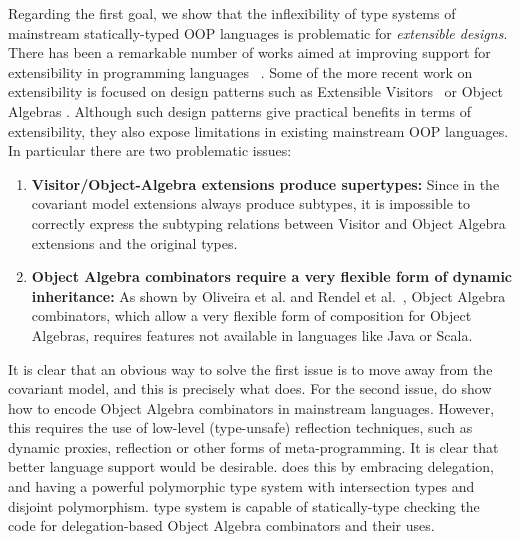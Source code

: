 Regarding the first goal, we show that the inflexibility of type systems of
mainstream statically-typed OOP languages is problematic for
\emph{extensible designs}.
There has been a remarkable number of works aimed at improving support
for extensibility in programming languages
~\cite{Prehofer97,Tarr99ndegrees,Harrison93subject,McDirmid01Jiazzi,Aracic06CaesarJ,Smaragdakis98mixin,nystrom2006j,togersen:2004,Zenger-Odersky2005,oliveira09modular,oliveira2012extensibility}. 
Some of the more recent work on extensibility is focused on design
patterns such as Extensible
Visitors~\cite{togersen:2004,oliveira09modular} or Object Algebras
\cite{oliveira2012extensibility}. 
Although such design patterns give practical benefits in terms of
extensibility, they also expose limitations in existing mainstream OOP
languages. In particular there are two problematic issues:

\begin{enumerate}

\item {\bf Visitor/Object-Algebra extensions produce supertypes:}
  Since in the covariant model extensions always produce subtypes, it
  is impossible to correctly express the subtyping relations between
  Visitor and Object Algebra extensions and the original types.

\item {\bf Object Algebra combinators require a very flexible form of
    dynamic inheritance:} As shown by Oliveira et al. and Rendel et
  al.~\cite{oliveira2013feature,rendel14attributes}, Object Algebra
  combinators, which allow a very flexible form of composition for
  Object Algebras, requires features not available in languages like
  Java or Scala.

\end{enumerate}

It is clear that an obvious way to solve the first issue is to 
move away from the covariant model, and this is precisely what \name does. 
For the second issue, \citet{oliveira2013feature,rendel14attributes}
do show how to encode Object Algebra combinators in mainstream
languages. However, this requires the
use of low-level (type-unsafe) reflection techniques, such as dynamic proxies,
reflection or other forms of meta-programming. It is clear
that better language support would be desirable. \name does 
this by embracing delegation, and having a powerful polymorphic type
system with intersection types and disjoint polymorphism. \name type
system is capable of statically-type checking the code for 
delegation-based Object Algebra combinators and their uses.

